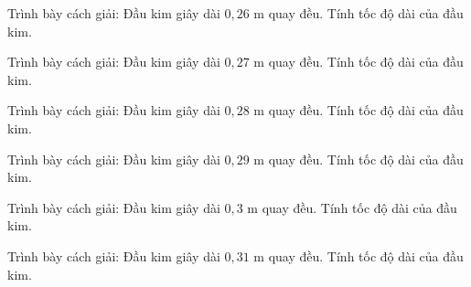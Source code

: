 \begin{bt}
Trình bày cách giải: Đầu kim giây dài $0,26$ m quay đều. Tính tốc độ dài của đầu kim.
\end{bt}

\begin{bt}
Trình bày cách giải: Đầu kim giây dài $0,27$ m quay đều. Tính tốc độ dài của đầu kim.
\end{bt}

\begin{bt}
Trình bày cách giải: Đầu kim giây dài $0,28$ m quay đều. Tính tốc độ dài của đầu kim.
\end{bt}

\begin{bt}
Trình bày cách giải: Đầu kim giây dài $0,29$ m quay đều. Tính tốc độ dài của đầu kim.
\end{bt}

\begin{bt}
Trình bày cách giải: Đầu kim giây dài $0,3$ m quay đều. Tính tốc độ dài của đầu kim.
\end{bt}

\begin{bt}
Trình bày cách giải: Đầu kim giây dài $0,31$ m quay đều. Tính tốc độ dài của đầu kim.
\end{bt}
